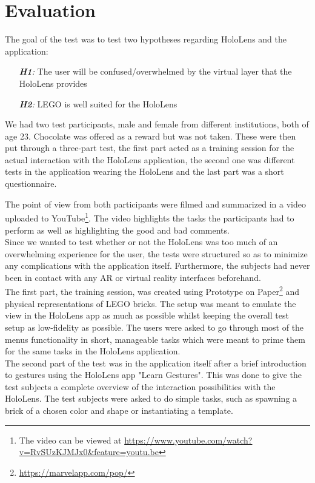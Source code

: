 
\section{Evaluation}
The goal of the test was to test two hypotheses regarding HoloLens and the application:
\begin{itemize}
	\item[\textit{\textbf{H1}:}] The user will be confused/overwhelmed by the virtual layer that the HoloLens provides
	\item[\textit{\textbf{H2}:}] LEGO is well suited for the HoloLens
\end{itemize}
We had two test participants, male and female from different institutions, both of age 23. Chocolate was offered as a reward but was not taken. These were then put through a three-part test, the first part acted as a training session for the actual interaction with the HoloLens application, the second one was different tests in the application wearing the HoloLens and the last part was a short questionnaire.\par
The point of view from both participants were filmed and summarized in a video uploaded to YouTube\footnote{The video can be viewed at \url{https://www.youtube.com/watch?v=RvSUzKJMJx0&feature=youtu.be}}. The video highlights the tasks the participants had to perform as well as highlighting the good and bad comments.
\\
Since we wanted to test whether or not the HoloLens was too much of an overwhelming experience for the user, the tests were structured so as to minimize any complications with the application itself. Furthermore, the subjects had never been in contact with any AR or virtual reality interfaces beforehand.\\
The first part, the training session, was created using Prototype on Paper\footnote{\url{https://marvelapp.com/pop/}} and physical representations of LEGO bricks. The setup was meant to emulate the view in the HoloLens app as much as possible whilst keeping the overall test setup as low-fidelity as possible. The users were asked to go through most of the menus functionality in short, manageable tasks which were meant to prime them for the same tasks in the HoloLens application.\\
The second part of the test was in the application itself after a brief introduction to gestures using the HoloLens app "Learn Gestures". This was done to give the test subjects a complete overview of the interaction possibilities with the HoloLens. The test subjects were asked to do simple tasks, such as spawning a brick of a chosen color and shape or instantiating a template.\\
